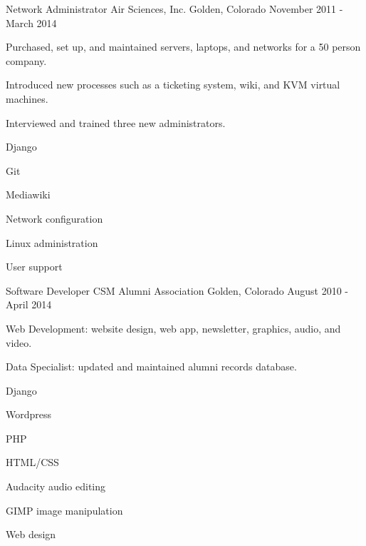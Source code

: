\begin{cventries}
  \cventry
    {Network Administrator} %
    {Air Sciences, Inc.} %
    {Golden, Colorado} %
    {November 2011 - March 2014} %
    {%
      \begin{cvitems} %
        \item {Purchased, set up, and maintained servers, laptops, and networks for a 50 person company.}
        \item {Introduced new processes such as a ticketing system, wiki, and KVM virtual machines.}
        \item {Interviewed and trained three new administrators.}
      \end{cvitems}
    }
    \begin{cventryskills}
      \item Django
      \item Git
      \item Mediawiki
      \item Network configuration
      \item Linux administration
      \item User support
    \end{cventryskills}

  \cventry
    {Software Developer} %
    {CSM Alumni Association} %
    {Golden, Colorado} %
    {August 2010 - April 2014} %
    {%
      \begin{cvitems} %
        \item {Web Development: website design, web app, newsletter, graphics, audio, and video.}
        \item {Data Specialist: updated and maintained alumni records database.}
      \end{cvitems}
    }
    \begin{cventryskills}
      \item Django
      \item Wordpress
      \item PHP
      \item HTML/CSS
      \item Audacity audio editing
      \item GIMP image manipulation
      \item Web design
    \end{cventryskills}


\end{cventries}
